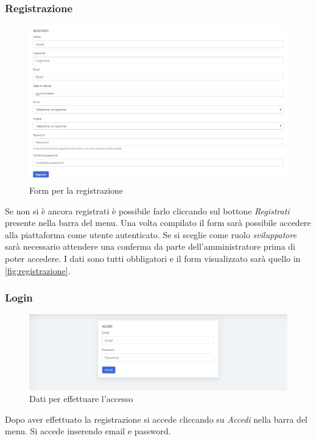     \subsubsection{Registrazione}
    	\begin{figure}[H]
        	\centering
        	\includegraphics[width=1\linewidth]{sez/img/autenticazione/formRegistrazione.PNG} 
        	\caption{Form per la registrazione}\label{fig:registrazione}
    	\end{figure}
	  Se non si è ancora registrati è possibile farlo cliccando sul bottone \textit{Registrati} presente nella barra del menu. Una volta compilato il form sarà possibile accedere alla piattaforma come utente autenticato. Se si sceglie come ruolo \textit{sviluppatore} sarà necessario attendere una conferma da parte dell'amministratore prima di poter accedere. I dati sono tutti obbligatori e il form visualizzato sarà quello in \autoref{fig:registrazione}.

    \subsubsection{Login}
    	\begin{figure}[H]
        	\centering
        	\includegraphics[width=1\linewidth]{sez/img/autenticazione/formAccedi.PNG} 
        	\caption{Dati per effettuare l'accesso}\label{fig:1}
    	\end{figure}
 	  Dopo aver effettuato la registrazione si accede cliccando su \textit{Accedi} nella barra del menu. Si accede inserendo email e password.


